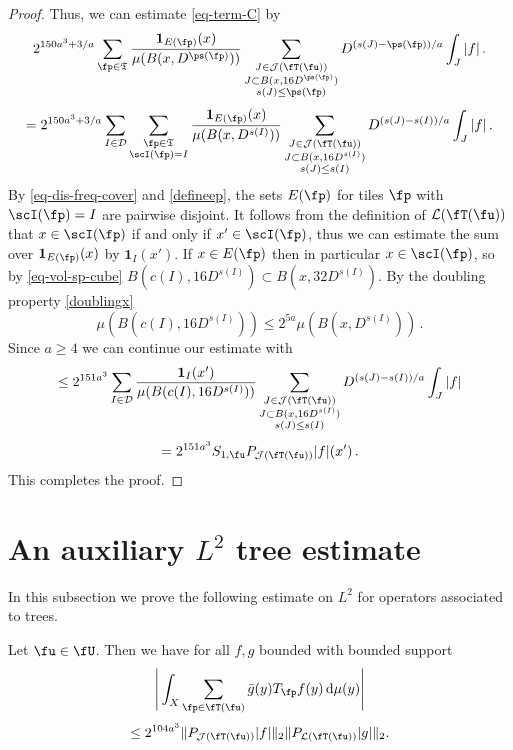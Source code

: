 \begin{proof}
    Thus, we can estimate \eqref{eq-term-C} by
    $$
        2^{150a^3 + 3/a}\sum_{\fp\in \mathfrak{T}}\frac{\mathbf{1}_{E(\fp)}(x)}{\mu(B(x,D^{\ps(\fp)}))}\sum_{\substack{J\in \mathcal{J}(\fT(\fu))\\J\subset B(x, 16D^{\ps(\fp)})\\ s(J) \le \ps(\fp)}} D^{(s(J) - \ps(\fp))/a} \int_J |f|\,.
    $$
    $$
        = 2^{150a^3 + 3/a}\sum_{I \in \mathcal{D}} \sum_{\substack{\fp\in \mathfrak{T}\\ \scI(\fp) = I}}\frac{\mathbf{1}_{E(\fp)}(x)}{\mu(B(x, D^{s(I)}))}\sum_{\substack{J\in \mathcal{J}(\fT(\fu))\\J\subset B(x, 16 D^{s(I)})\\ s(J) \le s(I)}} D^{(s(J) - s(I))/a} \int_J |f|\,.
    $$
    By \eqref{eq-dis-freq-cover} and \eqref{defineep}, the sets $E(\fp)$ for tiles $\fp$ with $\scI(\fp) = I$ are pairwise disjoint. It follows from the definition of $\mathcal{L}(\fT(\fu))$ that $x \in \scI(\fp)$ if and only if $x' \in \scI(\fp)$, thus we can estimate the sum over $\mathbf{1}_{E(\fp)}(x)$ by $\mathbf{1}_{I}(x')$.
    If $x \in E(\fp)$ then in particular $x \in \scI(\fp)$, so by \eqref{eq-vol-sp-cube} $B(c(I),16D^{s(I)}) \subset B(x, 32D^{s(I)})$. By the doubling property \eqref{doublingx}
    $$
        \mu(B(c(I), 16D^{s(I)})) \le 2^{5a} \mu(B(x, D^{s(I)}))\,.
    $$
    Since $a \ge 4$ we can continue our estimate with
    $$
        \le 2^{151a^3}\sum_{I \in \mathcal{D}} \frac{\mathbf{1}_{I}(x')}{\mu(B(c(I), 16D^{s(I)}))}\sum_{\substack{J\in \mathcal{J}(\fT(\fu))\\J\subset B(x, 16 D^{s(I)})\\ s(J) \le s(I)}} D^{(s(J) - s(I))/a} \int_J |f|
    $$
    $$
         = 2^{151a^3} S_{1,\fu} P_{\mathcal{J}(\fT(\fu))}|f|(x')\,.
    $$
    This completes the proof.
\end{proof}

\section{An auxiliary \texorpdfstring{$L^2$}{L2} tree estimate}

In this subsection we prove the following estimate on $L^2$ for operators associated to trees.

\begin{lemma}
    \label{tree-projection-estimate}
    Let $\fu \in \fU$.
    Then we have for all $f, g$ bounded with bounded support
    $$
        \Bigg|\int_X \sum_{\fp \in \fT(\fu)} \bar g(y) T_{\fp}f(y) \, \mathrm{d}\mu(y) \Bigg|
    $$
    \begin{equation}
        \label{eq-tree-est}
         \le 2^{104a^3}\|P_{\mathcal{J}(\fT(\fu))}|f|\|_{2}\|P_{\mathcal{L}(\fT(\fu))}|g|\|_{2}.
    \end{equation}
\end{lemma}

